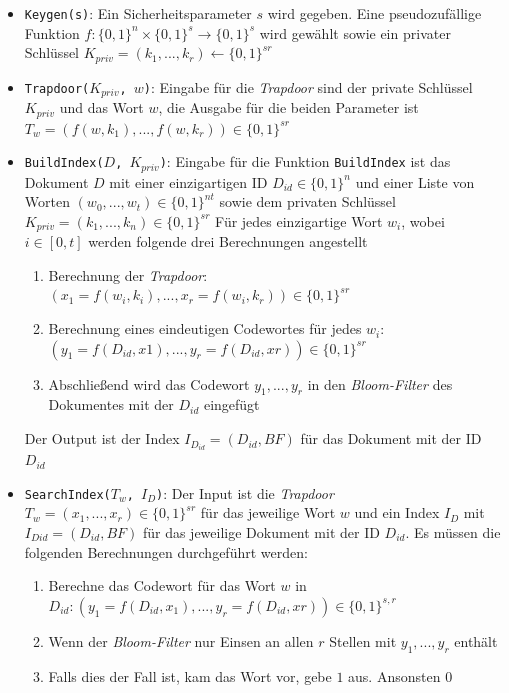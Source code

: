 \documentclass[conference]{IEEEtran}
\begin{document}
\begin{itemize}
  \item \texttt{Keygen(s)}: Ein Sicherheitsparameter $s$ wird gegeben. Eine pseudozufällige Funktion $f: \{0,1\}^n \times \{0,1\}^s \rightarrow \{0,1\}^s$ wird gewählt sowie ein privater Schlüssel $K_{priv} = (k_1,...,k_r) \leftarrow \{0,1\}^{sr}$ 
  \item \texttt{Trapdoor($K_{priv}$, $w$)}: Eingabe für die \textit{Trapdoor} sind der private Schlüssel $K_{priv}$ und das Wort $w$, die Ausgabe für die beiden Parameter ist $T_w = (f(w,k_1),...,f(w,k_r)) \in \{0,1\}^{sr}$
  \item \texttt{BuildIndex($D$, $K_{priv}$)}: Eingabe für die Funktion \texttt{BuildIndex} ist das Dokument $D$ mit einer einzigartigen ID $D_{id} \in \{0,1\}^n$ und einer Liste von Worten $(w_0,...,w_t) \in \{0,1\}^{nt}$ sowie dem privaten Schlüssel $K_{priv} = (k_1,...,k_n) \in \{0,1\}^{sr}$
  Für jedes einzigartige Wort $w_i$, wobei $i \in [0,t]$ werden folgende drei Berechnungen angestellt
  \begin{enumerate}
    \item Berechnung der \textit{Trapdoor}: $(x_1=f(w_i,k_i),...,x_r=f(w_i,k_r)) \in \{0,1\}^{sr}$
    \item Berechnung eines eindeutigen Codewortes für jedes $w_i$: $(y_1 = f(D_{id}, x1),...,y_r = f(D_{id},xr)) \in \{0,1\}^{sr}$
    \item Abschließend wird das Codewort $y_1,...,y_r$ in den \textit{Bloom-Filter} des Dokumentes mit der $D_{id}$ eingefügt
  \end{enumerate}
  Der Output ist der Index $I_{D_{id}} = (D_{id}, BF)$ für das Dokument mit der ID $D_{id}$
  \item \texttt{SearchIndex($T_w$, $I_D$)}: Der Input ist die \textit{Trapdoor} $T_w = (x_1,...,x_r) \in \{0,1\}^{sr}$ für das jeweilige Wort $w$ und ein Index $I_D$ mit $I_{D{id}} = (D_{id}, BF)$ für das jeweilige Dokument mit der ID $D_{id}$. Es müssen die folgenden Berechnungen durchgeführt werden:\\
  \begin{enumerate}
    \item Berechne das Codewort für das Wort $w$ in $D_{id}: (y_1 = f(D_{id}, x_1),...,y_r = f(D_{id},xr)) \in \{0,1\}^{s,r}$
    \item Wenn der \textit{Bloom-Filter} nur Einsen an allen $r$ Stellen mit $y_1,...,y_r$ enthält
    \item Falls dies der Fall ist, kam das Wort vor, gebe $1$ aus. Ansonsten 0  
  \end{enumerate}
\end{itemize}
\end{document}
